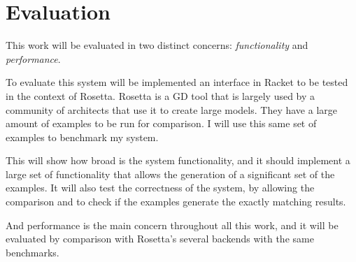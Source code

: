 
% 
% 

\section{Evaluation}
\label{sec:evaluation}

This work will be evaluated in two distinct concerns: \emph{functionality} and \emph{performance}.

To evaluate this system will be implemented an interface in Racket to be tested in the context of Rosetta. Rosetta is a GD tool that is largely used by a community of architects that use it to create large models. They have a large amount of examples to be run for comparison. I will use this same set of examples to benchmark my system.

This will show how broad is the system functionality, and it should implement a large set of functionality that allows the generation of a significant set of the examples. It will also test the correctness of the system, by allowing the comparison and to check if the examples generate the exactly matching results.

And performance is the main concern throughout all this work, and it will be evaluated by comparison with Rosetta's several backends with the same benchmarks.


